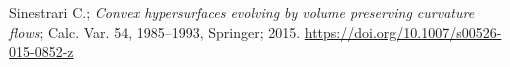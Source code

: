 \documentclass[a4paper, 12pt]{book}
\begin{document}
\begin{thebibliography}{21}
	 Sinestrari C.; {\em Convex hypersurfaces evolving by volume preserving curvature flows};  Calc. Var. 54, 1985–1993, Springer; 2015. \href{https://doi.org/10.1007/s00526-015-0852-z}{https://doi.org/10.1007/s00526-015-0852-z}
	
	
	
	
	
\end{thebibliography}
%
\end{document}

